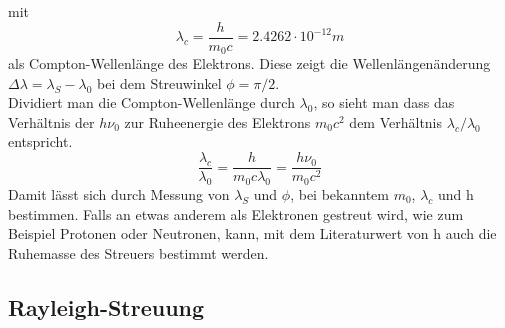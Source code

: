 \documentclass[.../bericht]{subfilies}
\begin{document}
        mit
        \begin{equation}
          \lambda_c=\frac{h}{m_0c}=2.4262\cdot10^{-12}m
          \label{cwellenl}
        \end{equation}
        als Compton-Wellenlänge des Elektrons. Diese zeigt die Wellenlängenänderung $\Delta \lambda =\lambda_S -\lambda_0$ bei dem Streuwinkel $\phi=\pi/2$. \\
        Dividiert man die Compton-Wellenlänge durch $\lambda_0$, so sieht man dass das Verhältnis der $h\nu_0$ zur Ruheenergie des Elektrons $m_0c^2$ dem Verhältnis $\lambda_c/\lambda_0$ entspricht.
      \begin{equation*}
      \frac{\lambda_c}{\lambda_0}=\frac{h}{m_0c\lambda_0}=\frac{h\nu_0}{m_0c^2}
    \end{equation*}
      Damit lässt sich durch Messung von $\lambda_S$ und $\phi$, bei bekanntem $m_0$, $\lambda_c$ und h bestimmen. Falls an etwas anderem als Elektronen gestreut wird, wie zum Beispiel Protonen oder Neutronen, kann, mit dem Literaturwert von h auch die Ruhemasse des Streuers bestimmt werden.\\
      \cite{dem:exp3}

    \subsection{Rayleigh-Streuung}
  	\label{sec:Rayleigh-Streuung}
\end{document}

